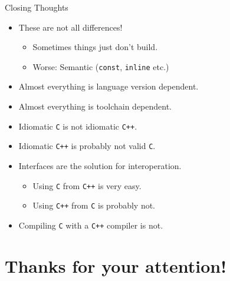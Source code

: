 \documentclass[presentation,aspectratio=169]{beamer}
\begin{document}
\begin{frame}[fragile,label={sec:org23c6824}]{Closing Thoughts}
  \begin{itemize}
  \item These are not all differences!
    \begin{itemize}
    \item Sometimes things just don't build.
    \item Worse: Semantic (\texttt{const}, \texttt{inline} etc.)
    \end{itemize}
  \item Almost everything is language version dependent.
  \item Almost everything is toolchain dependent.
  \item Idiomatic \texttt{C} is not idiomatic \texttt{C++}.
  \item Idiomatic \texttt{C++} is probably not valid \texttt{C}.
  \item Interfaces are the solution for interoperation.
    \begin{itemize}
    \item Using \texttt{C} from \texttt{C++} is very easy.
    \item Using \texttt{C++} from \texttt{C} is probably not.
    \end{itemize}
  \item Compiling \texttt{C} with a \texttt{C++} compiler is not.
  \end{itemize}
\end{frame}



\section{Thanks for your attention!}
\label{sec:org6df872a}
\end{document}
